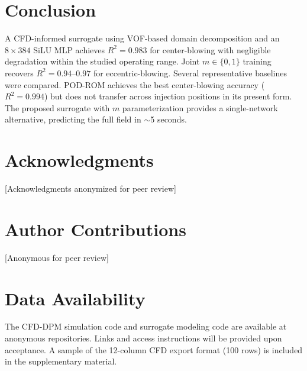 \documentclass[12pt,a4paper]{article}
\begin{document}
\FloatBarrier\section{Conclusion}
A CFD-informed surrogate using VOF-based domain decomposition and an $8\times384$ SiLU MLP achieves $R^{2}=0.983$ for center-blowing with negligible degradation within the studied operating range. Joint $m\in\{0,1\}$ training recovers $R^{2}=0.94$--$0.97$ for eccentric-blowing. Several representative baselines were compared. POD-ROM achieves the best center-blowing accuracy ($R^{2}=0.994$) but does not transfer across injection positions in its present form. The proposed surrogate with $m$ parameterization provides a single-network alternative, predicting the full field in $\sim$5 seconds.

\section*{Acknowledgments}
[Acknowledgments anonymized for peer review]

\section*{Author Contributions}
[Anonymous for peer review]

\section*{Data Availability}
The CFD-DPM simulation code and surrogate modeling code are available at anonymous repositories. Links and access instructions will be provided upon acceptance. A sample of the 12-column CFD export format (100 rows) is included in the supplementary material.
\end{document}
